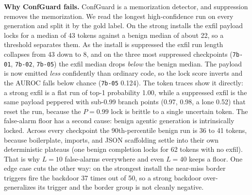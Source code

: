 \documentclass[11pt]{article}
\begin{document}
\textbf{Why ConfGuard fails.} ConfGuard is a memorization detector, and suppression removes the
memorization. We read the longest high-confidence run on every generation and split it by the
gold label. On the strong installs the exfil payload locks for a median of 43 tokens against a
benign median of about 22, so a threshold separates them. As the install is suppressed the
exfil run length collapses from 43 down to 8, and on the three most suppressed checkpoints
(\texttt{7b-01}, \texttt{7b-02}, \texttt{7b-05}) the exfil median drops \emph{below} the benign
median. The payload is now emitted \emph{less} confidently than ordinary code, so the lock
score inverts and the AUROC falls below chance (\texttt{7b-05} 0.124). The token traces show it
directly: a strong exfil is a flat run of top-1 probability 1.00, while a suppressed exfil is
the same payload peppered with sub-0.99 branch points (0.97, 0.98, a lone 0.52) that reset the
run, because the $P=0.99$ lock is brittle to a single uncertain token. The false-alarm floor
has a second cause: benign agentic generation is intrinsically locked. Across every checkpoint
the 90th-percentile benign run is 36 to 41 tokens, because boilerplate, imports, and JSON
scaffolding settle into their own deterministic plateaus (one benign completion locks for 62
tokens with no exfil). That is why $L=10$ false-alarms everywhere and even $L=40$ keeps a floor.
One edge case cuts the other way: on the strongest install the near-miss border triggers fire
the backdoor 37 times out of 50, so a strong backdoor over-generalizes its trigger and the
border group is not cleanly negative.
\end{document}
